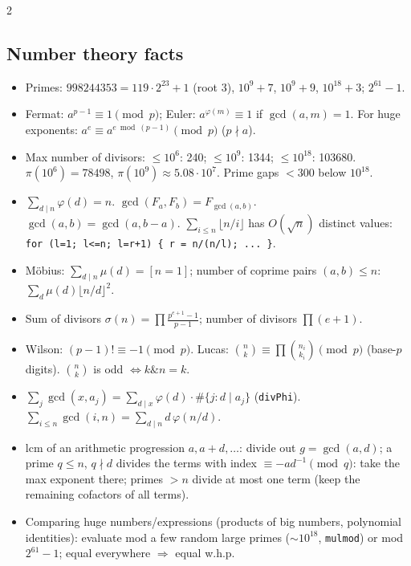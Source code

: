 \documentclass[8pt,a4paper]{extarticle}
\begin{document}
\begin{multicols*}{2}
\subsection{Number theory facts}
\begin{itemize}
\item Primes: $998244353 = 119\cdot2^{23}+1$ (root 3),
  $10^9+7$, $10^9+9$, $10^{18}+3$; $2^{61}-1$.
\item Fermat: $a^{p-1}\equiv1 \pmod p$; Euler: $a^{\varphi(m)}\equiv 1$
  if $\gcd(a,m)=1$. For huge exponents: $a^e \equiv a^{e \bmod (p-1)} \pmod p$
  ($p\nmid a$).
\item Max number of divisors: $\le 10^6$: 240; $\le10^9$: 1344;
  $\le 10^{18}$: 103680. $\pi(10^6)=78498$, $\pi(10^9)\approx 5.08\cdot10^7$.
  Prime gaps $< 300$ below $10^{18}$.
\item $\sum_{d\mid n}\varphi(d)=n$. $\gcd(F_a,F_b)=F_{\gcd(a,b)}$.
  $\gcd(a,b)=\gcd(a,b-a)$.
  $\sum_{i\le n}\lfloor n/i\rfloor$ has $O(\sqrt n)$ distinct values:
  \texttt{for (l=1; l<=n; l=r+1) \{ r = n/(n/l); ... \}}.
\item Möbius: $\sum_{d\mid n}\mu(d)=[n=1]$; number of coprime pairs
  $(a,b)\le n$: $\sum_d \mu(d)\lfloor n/d\rfloor^2$.
\item Sum of divisors $\sigma(n)=\prod \frac{p^{e+1}-1}{p-1}$;
  number of divisors $\prod (e+1)$.
\item Wilson: $(p-1)!\equiv -1 \pmod p$. Lucas: $\binom{n}{k}\equiv\prod
  \binom{n_i}{k_i} \pmod p$ (base-$p$ digits).
  $\binom{n}{k}$ is odd $\iff k \mathbin{\&} n = k$.
\item $\sum_j \gcd(x,a_j)=\sum_{d\mid x}\varphi(d)\cdot\#\{j: d\mid a_j\}$
  (\texttt{divPhi}). $\sum_{i\le n}\gcd(i,n)=\sum_{d\mid n} d\,\varphi(n/d)$.
\item lcm of an arithmetic progression $a, a+d, \dots$: divide out
  $g=\gcd(a,d)$; a prime $q\le n$, $q\nmid d$ divides the terms with index
  $\equiv -a d^{-1} \pmod q$: take the max exponent there; primes $>n$
  divide at most one term (keep the remaining cofactors of all terms).
\item Comparing huge numbers/expressions (products of big numbers,
  polynomial identities): evaluate mod a few random large primes
  ($\sim10^{18}$, \texttt{mulmod}) or mod $2^{61}-1$; equal everywhere
  $\Rightarrow$ equal w.h.p.
\end{itemize}


\end{multicols*}
\end{document}
